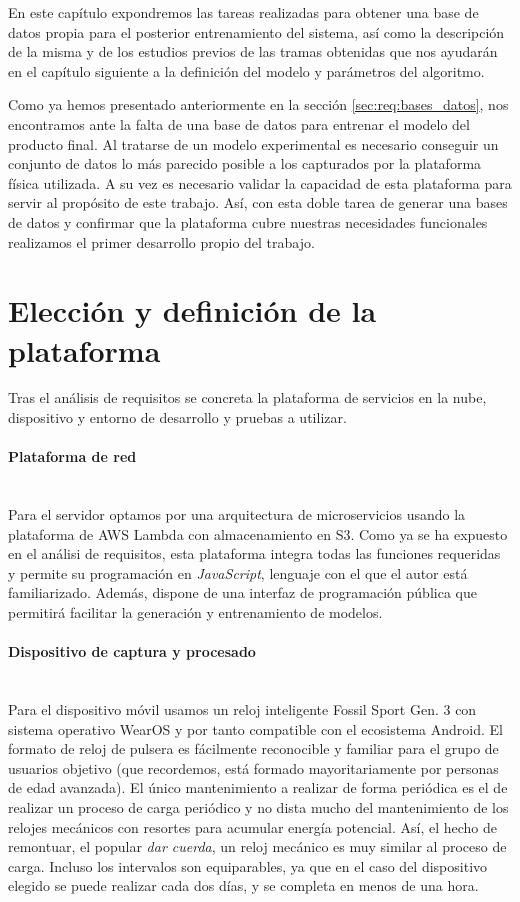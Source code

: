 
En este capítulo expondremos las tareas realizadas para obtener una base de datos propia para el posterior entrenamiento del sistema, así como la descripción de la misma y de los estudios previos de las tramas obtenidas que nos ayudarán en el capítulo siguiente a la definición del modelo y parámetros del algoritmo.

Como ya hemos presentado anteriormente en la sección \ref{sec:req:bases_datos}, nos encontramos ante la falta de una base de datos para entrenar el modelo del producto final. Al tratarse de un modelo experimental es necesario conseguir un conjunto de datos lo más parecido posible a los capturados por la plataforma física utilizada. A su vez es necesario validar la capacidad de esta plataforma para servir al propósito de este trabajo. Así, con esta doble tarea de generar una bases de datos y confirmar que la plataforma cubre nuestras necesidades funcionales realizamos el primer desarrollo propio del trabajo.

\section{Elección y definición de la plataforma}\label{sec:imp:plataforma}

Tras el análisis de requisitos se concreta la plataforma de servicios en la nube, dispositivo y entorno de desarrollo y pruebas a utilizar. 

\paragraph{Plataforma de red}\\
Para el servidor optamos por una arquitectura de microservicios usando la plataforma de AWS Lambda con almacenamiento en S3. Como ya se ha expuesto en el análisi de requisitos, esta plataforma integra todas las funciones requeridas y permite su programación en \textit{JavaScript}, lenguaje con el que el autor está familiarizado. Además, dispone de una interfaz de programación pública que permitirá facilitar la generación y entrenamiento de modelos.

\paragraph{Dispositivo de captura y procesado}\\
Para el dispositivo móvil usamos un reloj inteligente Fossil Sport Gen. 3 con sistema operativo WearOS y por tanto compatible con el ecosistema Android. El formato de reloj de pulsera es fácilmente reconocible y familiar para el grupo de usuarios objetivo (que recordemos, está formado mayoritariamente por personas de edad avanzada). El único mantenimiento a realizar de forma periódica es el de realizar un proceso de carga periódico y no dista mucho del mantenimiento de los relojes mecánicos con resortes para acumular energía potencial. Así, el hecho de remontuar, el popular \textit{dar cuerda}, un reloj mecánico es muy similar al proceso de carga. Incluso los intervalos son equiparables, ya que en el caso del dispositivo elegido se puede realizar cada dos días, y se completa en menos de una hora.

